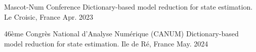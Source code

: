 \begin{cvpresentations}


\cvpresentation
{Mascot-Num Conference} %
{Dictionary-based model reduction for state estimation.} %
{Le Croisic, France} %
{Apr. 2023} %


\cvpresentation
{46\`eme Congr\`es National d'Analyse Num\'erique (CANUM)} %
{Dictionary-based model reduction for state estimation.} %
{Ile de Ré, France} %
{May. 2024} %


\end{cvpresentations}
